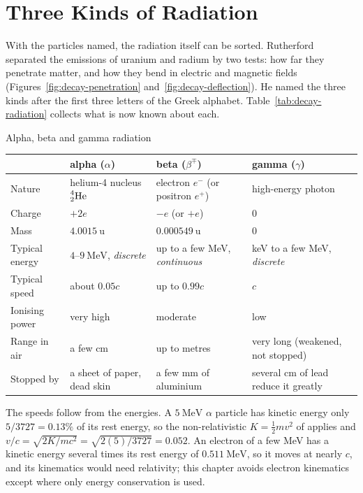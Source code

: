\section{Three Kinds of Radiation}\label{sec:decay-three}

With the particles named, the radiation itself can be sorted. Rutherford separated the emissions of
uranium and radium by two tests: how far they penetrate matter, and how they bend in electric and
magnetic fields (Figures~\ref{fig:decay-penetration} and~\ref{fig:decay-deflection}). He named the three
kinds after the first three letters of the Greek alphabet. Table~\ref{tab:decay-radiation} collects what
is now known about each.

\begin{tablebox}{Alpha, beta and gamma radiation}
\centering
\renewcommand{\arraystretch}{1.15}
\begin{tabular}{@{}>{\raggedright}p{2.3cm}>{\raggedright}p{3.6cm}>{\raggedright}p{3.6cm}>{\raggedright\arraybackslash}p{3.6cm}@{}}
\toprule
 & \textbf{alpha} ($\alpha$) & \textbf{beta} ($\beta^\mp$) & \textbf{gamma} ($\gamma$)\\
\midrule
Nature & helium-4 nucleus $\prescript{4}{2}{\mathrm{He}}$ & electron $e^-$ (or positron $e^+$) & high-energy photon\\
Charge & $+2e$ & $-e$ (or $+e$) & $0$\\
Mass & $\SI{4.0015}{\amu}$ & $\SI{0.000549}{\amu}$ & $0$\\
Typical energy & $4$--$\SI{9}{\MeV}$, \emph{discrete} & up to a few MeV, \emph{continuous} & keV to a few MeV, \emph{discrete}\\
Typical speed & about $0.05c$ & up to $0.99c$ & $c$\\
Ionising power & very high & moderate & low\\
Range in air & a few cm & up to metres & very long (weakened, not stopped)\\
Stopped by & a sheet of paper, dead skin & a few mm of aluminium & several cm of lead reduce it greatly\\
\bottomrule
\end{tabular}\label{tab:decay-radiation}
\end{tablebox}

The speeds follow from the energies. A $\SI{5}{\MeV}$ $\alpha$ particle has kinetic energy only
$5/3727=0.13\%$ of its rest energy, so the non-relativistic $K=\tfrac12mv^2$ of  applies
and $v/c=\sqrt{2K/mc^2}=\sqrt{2(5)/3727}=0.052$. An electron of a few MeV has a kinetic energy several
times its rest energy of $\SI{0.511}{\MeV}$, so it moves at nearly $c$, and its kinematics would need
relativity; this chapter avoids electron kinematics except where only energy conservation is used.

